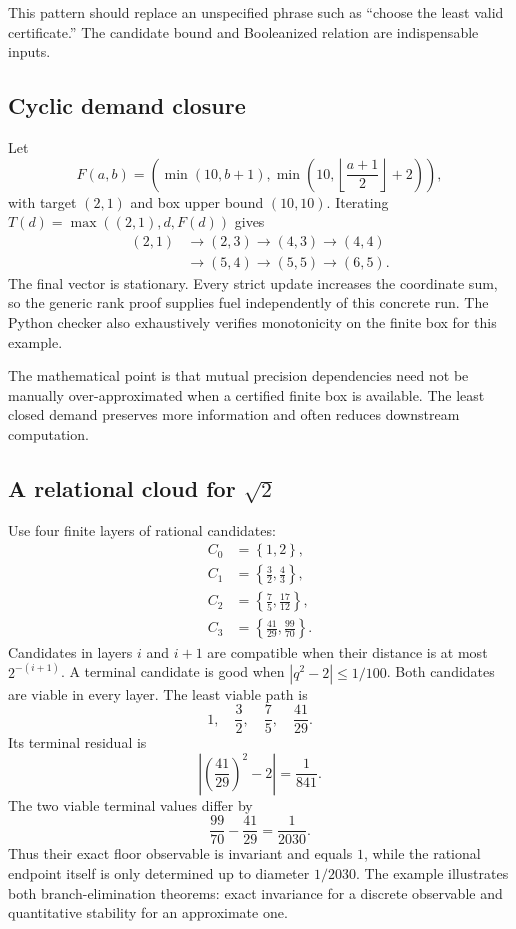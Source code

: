 This pattern should replace an unspecified phrase such as ``choose the least valid certificate.''  The candidate bound and Booleanized relation are indispensable inputs.

\subsection{Cyclic demand closure}

Let
\[
 F(a,b)=\left(\min(10,b+1),
               \min\left(10,\left\lfloor\frac{a+1}{2}\right\rfloor+2\right)
        \right),
\]
with target $(2,1)$ and box upper bound $(10,10)$.  Iterating
$T(d)=\max((2,1),d,F(d))$ gives
\[
\begin{split}
 (2,1)&\to(2,3)\to(4,3)\to(4,4)\\
      &\to(5,4)\to(5,5)\to(6,5).
\end{split}
\]
The final vector is stationary.  Every strict update increases the coordinate sum, so the generic rank proof supplies fuel independently of this concrete run.  The Python checker also exhaustively verifies monotonicity on the finite box for this example.

The mathematical point is that mutual precision dependencies need not be manually over-approximated when a certified finite box is available.  The least closed demand preserves more information and often reduces downstream computation.

\subsection{A relational cloud for \texorpdfstring{$\sqrt2$}{sqrt(2)}}

Use four finite layers of rational candidates:
\[
\begin{aligned}
 C_0&=\left\{1,2\right\},\\
 C_1&=\left\{\frac32,\frac43\right\},\\
 C_2&=\left\{\frac75,\frac{17}{12}\right\},\\
 C_3&=\left\{\frac{41}{29},\frac{99}{70}\right\}.
\end{aligned}
\]
Candidates in layers $i$ and $i+1$ are compatible when their distance is at most $2^{-(i+1)}$.  A terminal candidate is good when
$|q^2-2|\leq1/100$.  Both candidates are viable in every layer.  The least viable path is
\[
  1,\quad\frac32,\quad\frac75,\quad\frac{41}{29}.
\]
Its terminal residual is
\[
 \left|\left(\frac{41}{29}\right)^2-2\right|=\frac1{841}.
\]
The two viable terminal values differ by
\[
 \frac{99}{70}-\frac{41}{29}=\frac1{2030}.
\]
Thus their exact floor observable is invariant and equals $1$, while the rational endpoint itself is only determined up to diameter $1/2030$.  The example illustrates both branch-elimination theorems: exact invariance for a discrete observable and quantitative stability for an approximate one.


